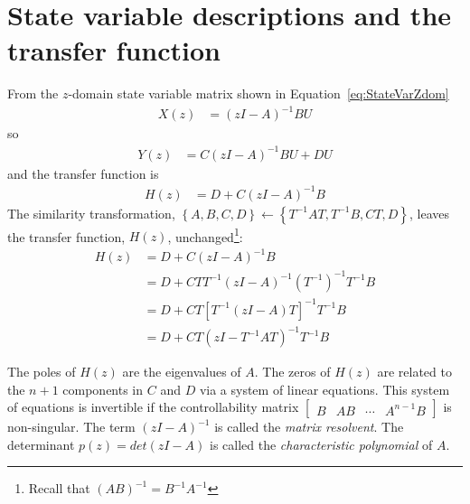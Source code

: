 \documentclass[a4paper,twoside,10pt,english]{report}
\begin{document}
\section{State variable descriptions and the transfer function\label{sec:Transfer-function}}
From the $z$-domain state variable matrix shown in Equation~\ref{eq:StateVarZdom}
\begin{align*}
X\left(z\right) &= \left(zI-A\right)^{-1}BU
\end{align*}
so
\begin{align*}
Y\left(z\right) &= C\left(zI-A\right)^{-1}BU+DU
\end{align*}
and the transfer function is
\begin{align}
H\left(z\right) &= D+C\left(zI-A\right)^{-1}B
\label{eqn:State-variable-transfer-function}
\end{align}
The similarity transformation,
 $\left\{A,B,C,D\right\} \leftarrow \left\{T^{-1}AT,T^{-1}B,CT,D\right\}$,
leaves the transfer function, $H\left(z\right)$, unchanged\footnote{Recall that
$\left(AB\right)^{-1}=B^{-1}A^{-1}$}:
\begin{align}
H\left(z\right) &= D+C\left(zI-A\right)^{-1}B \\
                &= D+CTT^{-1}\left(zI-A\right)^{-1}\left(T^{-1}\right)^{-1}T^{-1}B \\
                &= D+CT\left[T^{-1}\left(zI-A\right)T\right]^{-1}T^{-1}B \\
                &= D+CT\left(zI-T^{-1}AT\right)^{-1}T^{-1}B
\end{align}

The poles of $H\left(z\right)$ are the eigenvalues of $A$. The zeros of 
$H\left(z\right)$ are related to the $n+1$ components in $C$ and $D$ via a 
system of linear equations. This system of equations is invertible if the 
controllability matrix 
$\left[\begin{array}{cccc}B & AB & \cdots & A^{n-1}B\end{array}\right]$ 
is non-singular. The term $\left(zI-A\right)^{-1}$ is called the
\emph{matrix resolvent}. The determinant $p\left(z\right)=det\left(zI-A\right)$ 
is called the \emph{characteristic polynomial} of $A$. 
\end{document}

